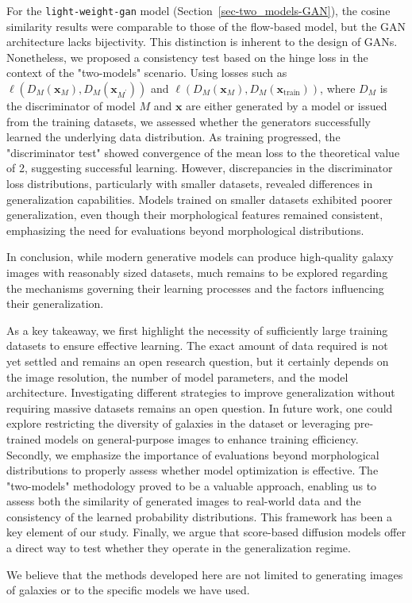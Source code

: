\documentclass[fleqn,usenatbib]{mnras}
\begin{document}
For the \texttt{light-weight-gan} model (Section~\ref{sec-two_models-GAN}), the cosine similarity results were comparable to those of the flow-based model, but the GAN architecture lacks bijectivity. This distinction is inherent to the design of GANs. Nonetheless, we proposed a consistency test based on the hinge loss in the context of the "two-models" scenario. Using losses such as \(\ell(D_M(\bm{x}_M), D_M(\bm{x}_{M^\prime}))\) and \(\ell(D_M(\bm{x}_M), D_M(\bm{x}_{\text{train}}))\), where \(D_M\) is the discriminator of model \(M\) and $\bm{x}$ are either generated by a model or issued from the training datasets, we assessed whether the generators successfully learned the underlying data distribution. As training progressed, the "discriminator test" showed convergence of the mean loss to the theoretical value of 2, suggesting successful learning. However, discrepancies in the discriminator loss distributions, particularly with smaller datasets, revealed differences in generalization capabilities. Models trained on smaller datasets exhibited poorer generalization, even though their morphological features remained consistent, emphasizing the need for evaluations beyond morphological distributions.


In conclusion, while modern generative models can produce high-quality galaxy images with reasonably sized datasets, much remains to be explored regarding the mechanisms governing their learning processes and the factors influencing their generalization.  
{\color{red}
As a key takeaway, we first highlight the necessity of sufficiently large training datasets to ensure effective learning. The exact amount of data required is not yet settled and remains an open research question, but it certainly depends on the image resolution, the number of model parameters, and the model architecture. Investigating different strategies to improve generalization without requiring massive datasets remains an open question. In future work, one could explore restricting the diversity of galaxies in the dataset or leveraging pre-trained models on general-purpose images to enhance training efficiency.  
Secondly, we emphasize the importance of evaluations beyond morphological distributions to properly assess whether model optimization is effective. The "two-models" methodology proved to be a valuable approach, enabling us to assess both the similarity of generated images to real-world data and the consistency of the learned probability distributions. This framework has been a key element of our study.  
Finally, we argue that score-based diffusion models offer a direct way to test whether they operate in the generalization regime.  

We believe that the methods developed here are not limited to generating images of galaxies or to the specific models we have used.  
}  
\end{document}

